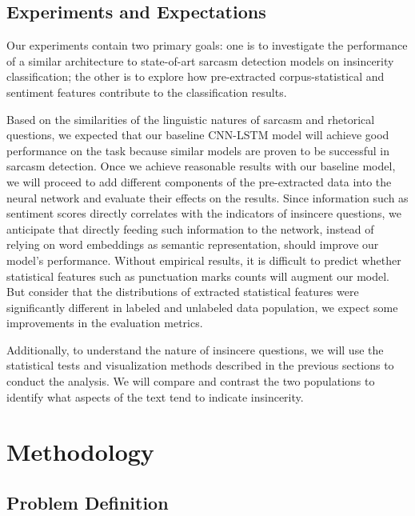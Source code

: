 \documentclass[12pt]{diazessay} %
\begin{document}
{\subsection{Experiments and Expectations}

Our experiments contain two primary goals: one is to investigate the performance of a similar architecture to state-of-art sarcasm detection models on insincerity classification; the other is to explore how pre-extracted corpus-statistical and sentiment features contribute to the classification results. 

Based on the similarities of the linguistic natures of sarcasm and rhetorical questions, we expected that our baseline CNN-LSTM model will achieve good performance on the task because similar models are proven to be successful in sarcasm detection. Once we achieve reasonable results with our baseline model, we will proceed to add different components of the pre-extracted data into the neural network and evaluate their effects on the results. Since information such as sentiment scores directly correlates with the indicators of insincere questions, we anticipate that directly feeding such information to the network, instead of relying on word embeddings as semantic representation, should improve our model's performance. Without empirical results, it is difficult to predict whether statistical features such as punctuation marks counts will augment our model. But consider that the distributions of extracted statistical features were significantly different in labeled and unlabeled data population, we expect some improvements in the evaluation metrics.

Additionally, to understand the nature of insincere questions, we will use the statistical tests and visualization methods described in the previous sections to conduct the analysis. We will compare and contrast the two populations to identify what aspects of the text tend to indicate insincerity. 


\section{Methodology}
\subsection{Problem Definition}

}
\end{document}

